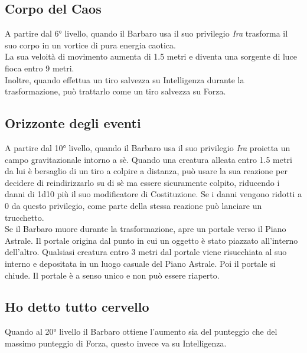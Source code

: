 \subsection{Corpo del Caos}
A partire dal 6° livello, quando il Barbaro usa il suo privilegio \textit{Ira} trasforma il suo corpo in un vortice di pura energia caotica.\\
La sua veloità di movimento aumenta di 1.5 metri e diventa una sorgente di luce fioca entro 9 metri.\\
Inoltre, quando effettua un tiro salvezza su Intelligenza durante la trasformazione, può trattarlo come un tiro salvezza su Forza.

\subsection{Orizzonte degli eventi}
A partire dal 10° livello, quando il Barbaro usa il suo privilegio \textit{Ira} proietta un campo gravitazionale intorno a sè. Quando una creatura alleata entro 1.5 metri da lui è bersaglio di un tiro a colpire a distanza, può usare la sua reazione per decidere di reindirizzarlo su di sè ma essere sicuramente colpito, riducendo i danni di 1d10 più il suo modificatore di Costituzione. Se i danni vengono ridotti a 0 da questo privilegio, come parte della stessa reazione può lanciare un trucchetto.\\
Se il Barbaro muore durante la trasformazione, apre un portale verso il Piano Astrale. Il portale origina dal punto in cui un oggetto è stato piazzato all'interno dell'altro. Qualsiasi creatura entro 3 metri dal portale viene risucchiata al suo interno e depositata in un luogo casuale del Piano Astrale. Poi il portale si chiude. Il portale è a senso unico e non può essere riaperto.

\subsection{}

\subsection{Ho detto tutto cervello}
Quando al 20° livello il Barbaro ottiene l'aumento sia del punteggio che del massimo punteggio di Forza, questo invece va su Intelligenza.